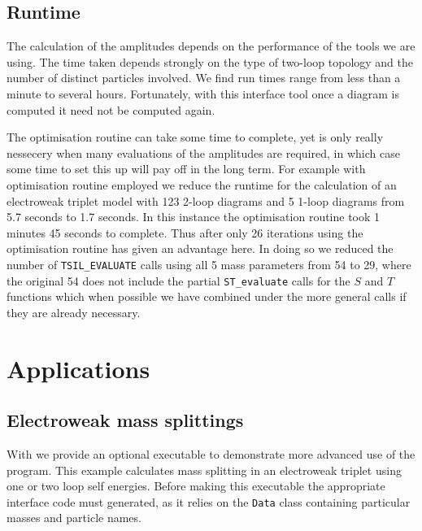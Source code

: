 \subsection{Runtime}

The calculation of the amplitudes depends on the performance of the tools we are using.  The time taken depends strongly on the type of two-loop topology and the number of distinct particles involved.  We find run times range from less than a minute to several hours.  Fortunately, with this interface tool once a diagram is computed it need not be computed again.

The optimisation routine can take some time to complete, yet is only really nessecery when many evaluations of the amplitudes are required, in which case some time to set this up will pay off in the long term.  For example with optimisation routine employed we reduce the runtime for the calculation of an electroweak triplet model with 123 2-loop diagrams and 5 1-loop diagrams from 5.7 seconds to 1.7 seconds.  In this instance the optimisation routine took 1 minutes 45 seconds to complete.  Thus after only 26 iterations using the optimisation routine has given an advantage here.  In doing so we reduced the number of \lstinline{TSIL_EVALUATE} calls using all 5 mass parameters from 54 to 29, where the original 54 does not include the partial \lstinline{ST_evaluate} calls for the $S$ and $T$ functions which when possible we have combined under the more general calls if they are already necessary.


\section{Applications}

\subsection{Electroweak mass splittings}

With \mb we provide an optional executable to demonstrate more advanced use of the program.  This example calculates mass splitting in an electroweak triplet using one or two loop self energies.  Before making this executable the appropriate \tsil interface code must generated, as it relies on the \lstinline{Data} class containing particular masses and particle names.

